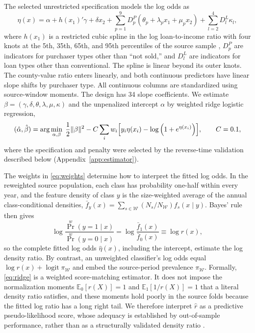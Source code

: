 \documentclass[letterpaper,12pt,usenames,dvipsnames]{article}
\newcommand{\E}{\mathbb{E}}
\newcommand{\pbrac}[1]{\left( #1 \right)}
\newcommand{\Bigsbrac}[1]{\Bigl[ #1 \Bigr]}
\theoremstyle{definition}
\begin{document}
The selected unrestricted specification models the log odds as
\begin{equation}
	\eta(x) = \alpha + h(x_1)'\gamma + \delta x_2
	+ \sum_{p=1}^{9} D^{P}_{p} \pbrac{\theta_p + \lambda_p x_1 + \mu_p x_2}
	+ \sum_{l=2}^{4} D^{L}_{l} \kappa_l ,
	\label{eq:logit}
\end{equation}
where $h(x_1)$ is a restricted cubic spline in the log loan-to-income ratio with four knots at
the 5th, 35th, 65th, and 95th percentiles of the source sample \citep{harrell2015regression},
$D^{P}_{p}$ are indicators for purchaser types other than ``not sold,'' and $D^{L}_{l}$ are
indicators for loan types other than conventional. The spline is linear beyond its outer knots.
The county-value ratio enters linearly, and both continuous predictors have linear slope shifts
by purchaser type. All continuous columns are standardized using source-window moments. The
design has 34 slope coefficients. We estimate $\beta = (\gamma, \delta, \theta, \lambda, \mu,
\kappa)$ and the unpenalized intercept $\alpha$ by weighted ridge logistic regression,
\begin{equation}
	(\hat{\alpha}, \hat{\beta}) = \arg\min_{\alpha, \beta} \;
	\frac{1}{2}\|\beta\|^2 - C \sum_{i} w_i \Bigsbrac{y_i \eta(x_i)
		- \log\pbrac{1 + e^{\eta(x_i)}}},
	\qquad C = 0.1 ,
	\label{eq:ridge}
\end{equation}
where the specification and penalty were selected by the reverse-time validation described
below (Appendix~\ref{app:estimator}).

The weights in \eqref{eq:weights} determine how to interpret the fitted log odds. In the
reweighted source population, each class has probability one-half within every year, and the
feature density of class $y$ is the size-weighted average of the annual class-conditional
densities, $\bar{f}_y(x) = \sum_{s \in \mathcal{W}} (N_s/N_{\mathcal{W}}) f_s(x \mid y)$.
Bayes' rule then gives
\begin{equation}
	\log \frac{\Pr^{w}(y = 1 \mid x)}{\Pr^{w}(y = 0 \mid x)}
	= \log \frac{\bar{f}_1(x)}{\bar{f}_0(x)} \equiv \log r(x) ,
	\label{eq:density_ratio}
\end{equation}
so the complete fitted log odds $\hat{\eta}(x)$, including the intercept, estimate the log
density ratio. By contrast, an unweighted classifier's log odds equal $\log r(x) +
\operatorname{logit} \pi_{\mathcal{W}}$ and embed the source-period prevalence
$\pi_{\mathcal{W}}$. Formally, \eqref{eq:ridge} is a weighted score-matching estimator. It does
not impose the normalization moments $\E_0[r(X)] = 1$ and $\E_1[1/r(X)] = 1$ that a literal
density ratio satisfies, and these moments hold poorly in the source folds because the fitted
log ratio has a long right tail. We therefore interpret $\hat{r}$ as a predictive
pseudo-likelihood score, whose adequacy is established by out-of-sample performance, rather
than as a structurally validated density ratio \citep[see][]{sugiyama2012density}.
\end{document}
